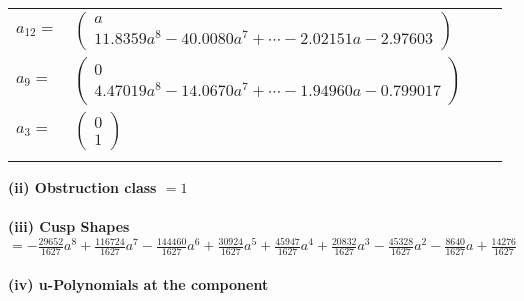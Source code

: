 \documentclass[1p]{elsarticle_modified}
\theoremstyle{definition}
\begin{document}
\begin{tabular}{m{7pt} m{180pt} m{7pt} m{180pt} }
\flushright $a_{12}=$&$\begin{pmatrix}a\\11.8359 a^{8}-40.0080 a^{7}+\cdots-2.02151 a-2.97603\end{pmatrix}$ \\
\flushright $a_{9}=$&$\begin{pmatrix}0\\4.47019 a^{8}-14.0670 a^{7}+\cdots-1.94960 a-0.799017\end{pmatrix}$ \\
\flushright $a_{3}=$&$\begin{pmatrix}0\\1\end{pmatrix}$\\&\end{tabular}
\flushleft \textbf{(ii) Obstruction class $= 1$}\\~\\
\flushleft \textbf{(iii) Cusp Shapes $= -\frac{29652}{1627} a^8+\frac{116724}{1627} a^7-\frac{144460}{1627} a^6+\frac{30924}{1627} a^5+\frac{45947}{1627} a^4+\frac{20832}{1627} a^3-\frac{45328}{1627} a^2-\frac{8640}{1627} a+\frac{14276}{1627}$}\\~\\
\newpage\renewcommand{\arraystretch}{1}
\flushleft \textbf{(iv) u-Polynomials at the component}\newline \\
\end{document}
